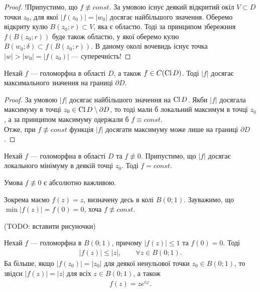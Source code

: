\documentclass{math_library}
\begin{document}
\begin{proof}
!Припустимо, що $f \not\equiv const$. За умовою існує деякий відкритий окіл $V \subset D$ точки $z_0$, для якої $|f(z_0)| = |w_0|$ досягає найбільшого значення. Оберемо відкриту кулю $B(z_0;r) \subset V$, яка є областю. Тоді за принципом збережння $f(B(z_0;r))$ буде також областю, у якої оберемо кулю $B(w_0;\delta) \subset f(B(z_0;r))$. В даному околі вочевидь існує точка $|w| > |w_0| = |f(z_0)|$ --- суперечність!
\end{proof}

\begin{corollary}
Нехай $f$ --- голоморфна в області $D$, а також $f \in C(\operatorname{Cl} D)$. Тоді $|f|$ досягає максимального значення на границі $\partial D$.
\end{corollary}

\begin{proof}
За умовою $|f|$ досягає найбільшого значення на $\operatorname{Cl} D$. Якби $|f|$ досягала максимуму в точці $z_0 \in \operatorname{Cl} D \setminus \partial D$, то тоді мали б локальний максимум в точці $z_0$, а за принципом максимуму одержали б $f \equiv const$.\\
Отже, при $f \not\equiv const$ функція $|f|$ досягати максимуму може лише на границі $\partial D$.
\end{proof}

\begin{corollary}
Нехай $f$ --- голоморфна в області $D$ та $f \not\equiv 0$. Припустимо, що $|f|$ досягає локального мінімуму в деякій точці $z_0$. Тоді $f = const$.
\end{corollary}

\begin{remark}
Умова $f \not\equiv 0$ є абсолютно важливою.
\end{remark}

\begin{example}
Зокрема маємо $f(z) = z$, визначену десь в колі $B(0;1)$. Зауважимо, що $\min |f(z)| = f(0) = 0$, хоча $f \not\equiv const$.
\end{example}

(TODO: вставити рисуночки)

\begin{lemma}
Нехай $f$ --- голоморфна в $B(0;1)$, причому $|f(z)| \leq 1$ та $f(0) = 0$. Тоді
\begin{align*}
|f(z)| \leq |z|, \qquad \forall z \in B(0;1).
\end{align*}
Ба більше, якщо $|f(z_0)| = |z_0|$ для деякої ненульової точки $z_0 \in B(0;1)$, то звідси $|f(z)| = |z|$ для всіх $z \in B(0;1)$, а також
\begin{align*}
f(z) = z e^{i \varphi}.
\end{align*}
\end{lemma}
\end{document}
